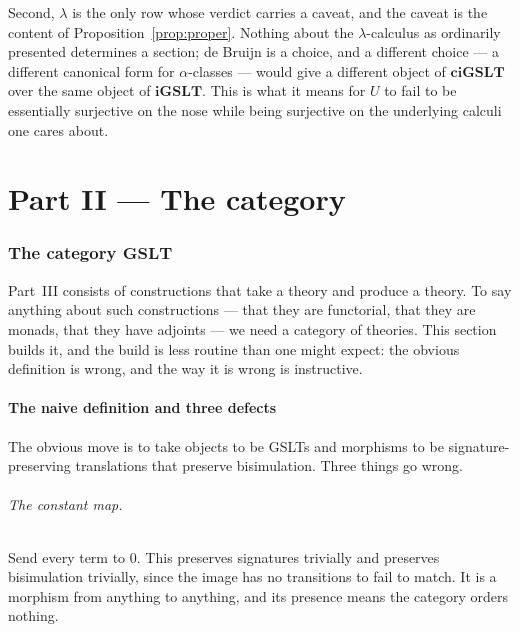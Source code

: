 \documentclass[11pt]{article}
\theoremstyle{definition}
\theoremstyle{plain}
\theoremstyle{remark}
\newcommand{\GSLT}{\mathbf{GSLT}}
\newcommand{\iGSLT}{\mathbf{iGSLT}}
\newcommand{\ciGSLT}{\mathbf{ciGSLT}}
\begin{document}
Second, $\lambda$ is the only row whose verdict carries a caveat, and the caveat is the
content of Proposition~\ref{prop:proper}. Nothing about the $\lambda$-calculus as
ordinarily presented determines a section; de Bruijn is a choice, and a different choice
--- a different canonical form for $\alpha$-classes --- would give a different object of
$\ciGSLT$ over the same object of $\iGSLT$. This is what it means for $U$ to fail to be
essentially surjective on the nose while being surjective on the underlying calculi one
cares about.

\part*{Part II --- The category}

\section{The category \texorpdfstring{$\GSLT$}{GSLT}}
\label{sec:category}

Part~III consists of constructions that take a theory and produce a theory. To say
anything about such constructions --- that they are functorial, that they are monads,
that they have adjoints --- we need a category of theories. This section builds it, and
the build is less routine than one might expect: the obvious definition is wrong, and
the way it is wrong is instructive.

\subsection{The naive definition and three defects}

The obvious move is to take objects to be GSLTs and morphisms to be signature-preserving
translations that preserve bisimulation. Three things go wrong.

\paragraph{The constant map.} Send every term to $0$. This preserves signatures
trivially and preserves bisimulation trivially, since the image has no transitions to
fail to match. It is a morphism from anything to anything, and its presence means the
category orders nothing.
\end{document}
